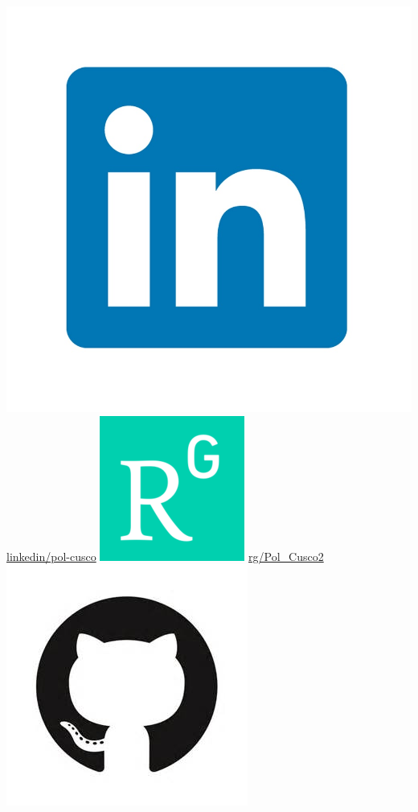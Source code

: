 \documentclass[]{friggeri-cv} %
\begin{document}
\begin{aside}
  \includegraphics[scale=0.02]{linkedinlogo.jpeg}
  \href{http://www.linkedin.com/in/pol-cuscó-80246963}{linkedin/pol-cusco}
  \includegraphics[scale=0.07]{researchgatelogo.png}
  \href{https://www.researchgate.net/profile/Pol\_Cusco2}{rg/Pol\_Cusco2}
  \includegraphics[scale=0.08]{githublogo.jpeg}

\end{aside}
\end{document}
